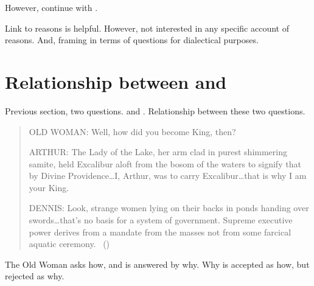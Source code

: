 \begin{note}
  However, continue with \qWhy{}.

  Link to reasons is helpful.
  However, not interested in any specific account of reasons.
  And, framing in terms of questions for dialectical purposes.
\end{note}

\section{Relationship between \qWhy{} and \qHow{}}

\begin{note}
  Previous section, two questions.
  \qWhy{} and \qHow{}.
  Relationship between these two questions.
\end{note}

\begin{note}
  \begin{quote}
    \begin{screenplay}
    \item[OLD WOMAN:]
      Well, how did you become King, then?
    \item[ARTHUR:]
      The Lady of the Lake, her arm clad in purest shimmering samite, held Excalibur aloft from the bosom of the waters to signify that by Divine Providence\dots I, Arthur, was to carry Excalibur\dots that is why I am your King.
    \item[DENNIS:]
      Look, strange women lying on their backs in ponds handing over swords\dots that's no basis for a system of government.
      Supreme executive power derives from a mandate from the masses not from some farcical aquatic ceremony.\newline
      \mbox{ }\hfill\mbox{(\cite[8--9]{Cleese:1974aa})}
    \end{screenplay}
  \end{quote}

  The Old Woman asks how, and is answered by why.
  Why is accepted as how, but rejected as why.
\end{note}

